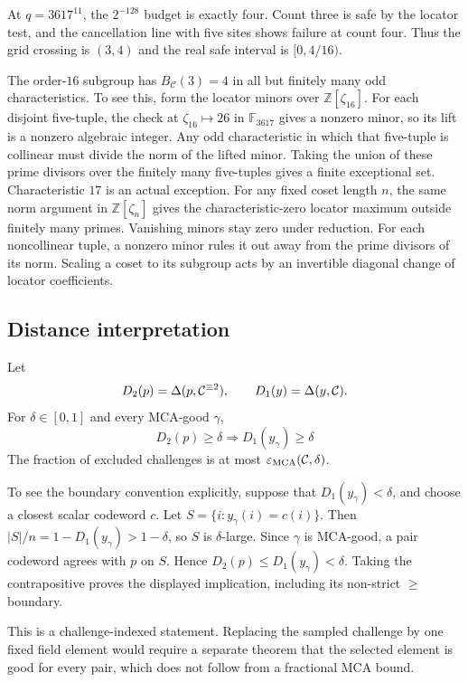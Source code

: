 At \(q=3617^{11}\), the \(2^{-128}\) budget is exactly four. Count three
is safe by the locator test, and the cancellation line with five sites
shows failure at count four. Thus the grid crossing is \((3,4)\) and the
real safe interval is \([0,4/16)\).

The order-\(16\) subgroup has \(B_{\mathcal C}(3)=4\) in all but finitely
many odd characteristics. To see this, form the locator minors over
\(\mathbb Z[\zeta_{16}]\). For each disjoint five-tuple, the check at
\(\zeta_{16}\mapsto26\) in \(\mathbb F_{3617}\) gives a nonzero minor,
so its lift is a nonzero algebraic integer. Any odd characteristic in
which that five-tuple is collinear must divide the norm of the lifted
minor. Taking the union of these prime divisors over the finitely many
five-tuples gives a finite exceptional set. Characteristic \(17\) is an
actual exception.
For any fixed coset length \(n\), the same norm argument in
\(\mathbb Z[\zeta_n]\) gives the characteristic-zero locator maximum
outside finitely many primes. Vanishing minors stay zero under reduction.
For each noncollinear tuple, a nonzero minor rules it out away from the
prime divisors of its norm. Scaling a coset to its subgroup acts by an
invertible diagonal change of locator coefficients.

\subsection{Distance interpretation}

Let
\[
  D_2(p)=\Delta(p,\mathcal C^{\equiv 2}),
  \qquad
  D_1(y)=\Delta(y,\mathcal C).
\]
For \(\delta\in[0,1]\) and every MCA-good \(\gamma\),
\[
  D_2(p)\ge\delta
  \Longrightarrow
  D_1(y_\gamma)\ge\delta
\]
The fraction of excluded challenges is at most
\(\varepsilon_{\operatorname{MCA}}(\mathcal C,\delta)\).

To see the boundary convention explicitly, suppose that
\(D_1(y_\gamma)<\delta\), and choose a closest scalar codeword \(c\).
Let \(S=\{i:y_\gamma(i)=c(i)\}\). Then
\(|S|/n=1-D_1(y_\gamma)>1-\delta\), so \(S\) is \(\delta\)-large.
Since \(\gamma\) is MCA-good, a pair codeword agrees with \(p\) on
\(S\). Hence \(D_2(p)\le D_1(y_\gamma)<\delta\). Taking the
contrapositive proves the displayed implication, including its non-strict
\(\ge\) boundary.

This is a challenge-indexed statement.  Replacing the sampled challenge by one
fixed field element would require a separate theorem that the selected element
is good for every pair, which does not follow from a fractional MCA bound.

